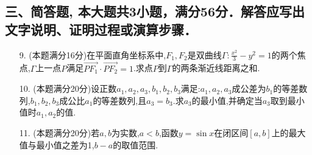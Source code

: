 \documentclass[10pt,a4paper]{ctexart}
\begin{document}
	\subsection*{三、简答题, 本大题共3小题，满分56分．解答应写出文字说明、证明过程或演算步骤．}
	\begin{spacing}{1.8}
		\begin{itemize}
			\item[9.](本题满分16分)在平面直角坐标系中,$F_1,F_2$是双曲线$\Gamma :\frac{x^2}{3}-y^2=1$的两个焦点,$\Gamma$上一点$P$满足$\vec{PF_1} \cdot \vec{PF_2}=1$.求点$P$到$\Gamma$的两条渐近线距离之和.
			\item[10.](本题满分20分)设正数$a_1,a_2,a_3,b_1,b_2,b_3$满足:$a_1,a_2,a_3$成公差为$b_1$的等差数列,$b_1,b_2,b_3$成公比$a_1$的等差数列,且$a_3=b_3$.求$a_3$的最小值,并确定当$a_3$取到最小值时$a_1,a_2$的值.
			\item[11.](本题满分20分)若$a,b$为实数,$a<b$,函数$y=\sin{x}$在闭区间$[a,b]$上的最大值与最小值之差为1,$b-a$的取值范围.
		\end{itemize}
	\end{spacing}
\end{document}
